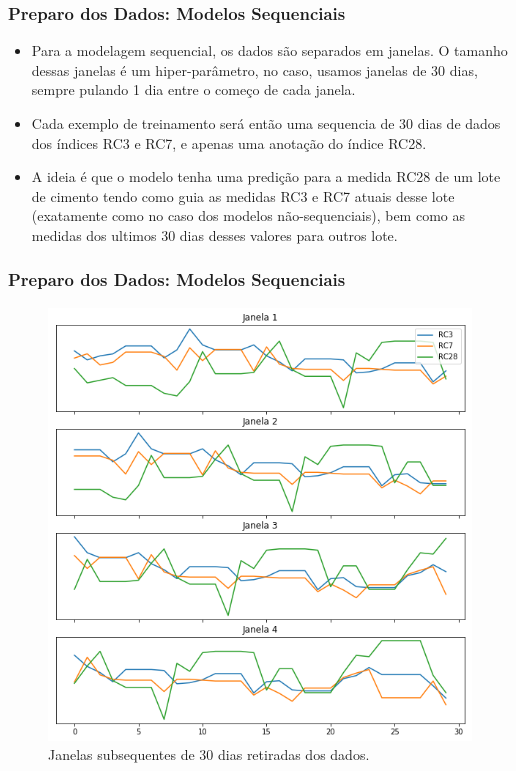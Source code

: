 \documentclass{beamer}
\begin{document}
\begin{frame}
  \frametitle{Preparo dos Dados: Modelos Sequenciais}
  \begin{itemize}
  \item Para a modelagem sequencial, os dados são separados em janelas. O tamanho
    dessas janelas é um hiper-parâmetro, no caso, usamos janelas de 30 dias,
    sempre pulando 1 dia entre o começo de cada janela.
    
  \item Cada exemplo de treinamento será então uma sequencia de 30 dias de dados dos
    índices RC3 e RC7, e apenas uma anotação do índice RC28.
  \item A ideia é que o modelo tenha uma predição para a medida RC28  de um lote de cimento
    tendo como guia as medidas RC3 e RC7 atuais desse lote (exatamente como no
    caso dos modelos não-sequenciais), bem como as medidas
    dos ultimos 30 dias desses valores para outros lote.
  \end{itemize}
\end{frame}

\begin{frame}
  \frametitle{Preparo dos Dados: Modelos Sequenciais}
    \begin{figure}[H]
  \centering
  \includegraphics[scale=0.3]{slides_windows}
  \caption{Janelas subsequentes de 30 dias retiradas dos dados.}
\end{figure}
\end{frame}
\end{document}
